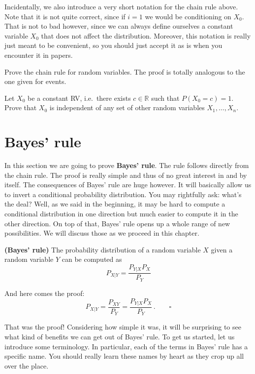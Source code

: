 Incidentally, we also introduce a very short notation for the chain rule above. Note that it is not quite correct, since if
$ i = 1 $ we would be conditioning on $ X_{0} $. That is not to bad however, since we can always define ourselves a constant variable $ X_{0} $ that does not affect the distribution. Moreover, this notation is really just meant to be convenient, so you should just accept it as is when you encounter it in papers.

\begin{Exercise}
Prove the chain rule for random variables. The proof is totally analogous to the one given for events.
\end{Exercise}

\begin{Exercise}
Let $X_0$ be a constant RV, i.e.\ there exists $c \in \mathbb{R}$ such that $P(X_0 = c)=1$. 
Prove that $X_0$ is independent of any set of other random variables $X_1,\ldots,X_n$.
\end{Exercise}

\section{Bayes' rule}

In this section we are going to prove \textbf{Bayes' rule}. The rule follows directly from the chain rule.
The proof is really simple and thus of no great interest in and by itself. The consequences of Bayes' rule
are huge however. It will basically allow us to invert a conditional probability distribution. You may rightfully
ask: what's the deal? Well, as we said in the beginning, it may be hard to compute a conditional distribution in one
direction but much easier to compute it in the other direction. On top of that, Bayes' rule opens up a whole range of new possibilities. We will discuss those as we proceed in this chapter.
\begin{Theorem}{\textbf{(Bayes' rule)}}
The probability distribution of a random variable $ X $ given a random variable $ Y $ can be computed as
$$ P_{X|Y} = \dfrac{P_{Y|X}P_{X}}{P_{Y}} $$
\end{Theorem}

And here comes the proof:
\begin{equation}
P_{X|Y} = \dfrac{P_{XY}}{P_{Y}} = \dfrac{P_{Y|X}P_{X}}{P_{Y}} \, . \qquad  \square
\end{equation}

That was the proof! Considering how simple it was, it will be surprising to see what kind of benefits we can get out
of Bayes' rule. To get us started, let us introduce some terminology. In particular, each of the terms
in Bayes' rule has a specific name. You should really learn these names by heart as they crop up all over the place.

